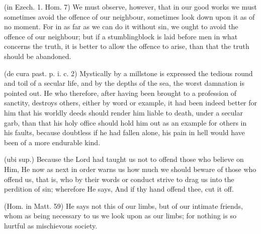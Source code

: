  (in Ezech. 1. Hom. 7) We must observe, however, that in our good works we must sometimes avoid the offence of our neighbour, sometimes look down upon it as of no moment. For in as far as we can do it without sin, we ought to avoid the offence of our neighbour; but if a stumblingblock is laid before men in what concerns the truth, it is better to allow the offence to arise, than that the truth should be abandoned.

 (de cura past. p. i. c. 2) Mystically by a millstone is expressed the tedious round and toil of a secular life, and by the depths of the sea, the worst damnation is pointed out. He who therefore, after having been brought to a profession of sanctity, destroys others, either by word or example, it had been indeed better for him that his worldly deeds should render him liable to death, under a secular garb, than that his holy office should hold him out as an example for others in his faults, because doubtless if he had fallen alone, his pain in hell would have been of a more endurable kind.

 

 (ubi sup.) Because the Lord had taught us not to offend those who believe on Him, He now as next in order warns us how much we should beware of those who offend us, that is, who by their words or conduct strive to drag us into the perdition of sin; wherefore He says, And if thy hand offend thee, cut it off.

 (Hom. in Matt. 59) He says not this of our limbs, but of our intimate friends, whom as being necessary to us we look upon as our limbs; for nothing is so hurtful as mischievous society.

